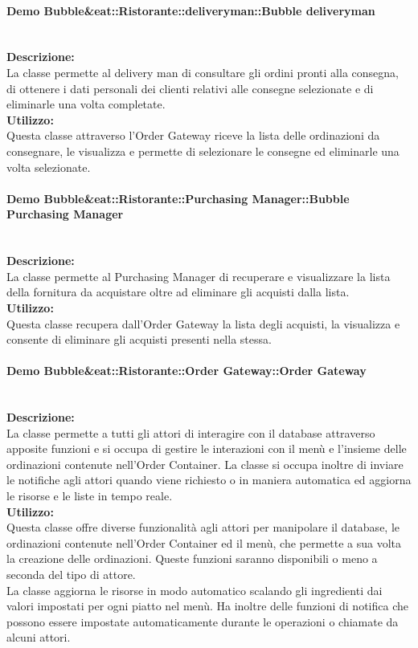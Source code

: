 \paragraph{Demo Bubble\&eat::Ristorante::deliveryman::Bubble deliveryman}\mbox{}\\
\textbf{Descrizione:}\\
La classe permette al delivery man di consultare gli ordini pronti alla consegna, di ottenere i dati personali dei clienti relativi alle consegne selezionate e di eliminarle una volta completate.\\
\textbf{Utilizzo:}\\
Questa classe attraverso l’Order Gateway riceve la lista delle ordinazioni da consegnare, le visualizza e permette di selezionare le consegne ed eliminarle una volta selezionate.

\paragraph{Demo Bubble\&eat::Ristorante::Purchasing Manager::Bubble Purchasing Manager}\mbox{}\\
\textbf{Descrizione:}\\
La classe permette al Purchasing Manager di recuperare e visualizzare la lista della fornitura da acquistare oltre ad eliminare gli acquisti dalla lista.\\
\textbf{Utilizzo:}\\
Questa classe recupera dall’Order Gateway la lista degli acquisti, la visualizza e consente di eliminare gli acquisti presenti nella stessa.

\paragraph{Demo Bubble\&eat::Ristorante::Order Gateway::Order Gateway}\mbox{}\\
\textbf{Descrizione:}\\
La classe permette a tutti gli attori di interagire con il database attraverso apposite funzioni e si occupa di gestire le interazioni con il menù e l’insieme delle ordinazioni contenute nell’Order Container. La classe si occupa inoltre di inviare le notifiche agli attori quando viene richiesto o in maniera automatica ed aggiorna le risorse e le liste in tempo reale.\\
\textbf{Utilizzo:}\\
Questa classe offre diverse funzionalità agli attori per manipolare il database, le ordinazioni contenute nell’Order Container ed il menù, che permette a sua volta la creazione delle ordinazioni. Queste funzioni saranno disponibili o meno a seconda del tipo di attore.\\
La classe aggiorna le risorse in modo automatico scalando gli ingredienti dai valori impostati per ogni piatto nel menù. Ha inoltre delle funzioni di notifica che possono essere impostate automaticamente durante le operazioni o chiamate da alcuni attori.

